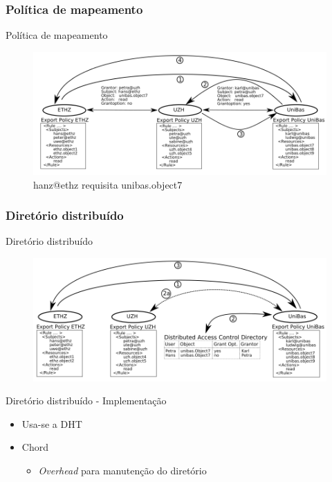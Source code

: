 \documentclass{beamer}
\begin{document}
\subsubsection{Política de mapeamento}
  \begin{frame}{Política de mapeamento}
   \begin{figure}[H]
    \includegraphics[scale=0.36]{demap_fig2_mp.png}
    \caption{hanz@ethz requisita unibas.object7}
   \end{figure}

  \end{frame}


\subsubsection{Diretório distribuído}
  \begin{frame}{Diretório distribuído}
   \begin{figure}[H]
    \includegraphics[scale=0.36]{demap_fig3_dd.png}
   \end{figure}

  \end{frame}
  
  \begin{frame}{Diretório distribuído - Implementação}
    \begin{itemize}
     \item Usa-se a DHT
     \item Chord
     \begin{itemize}
      \item \textit{Overhead} para manutenção do diretório
     \end{itemize}

    \end{itemize}

  \end{frame}
\end{document}
